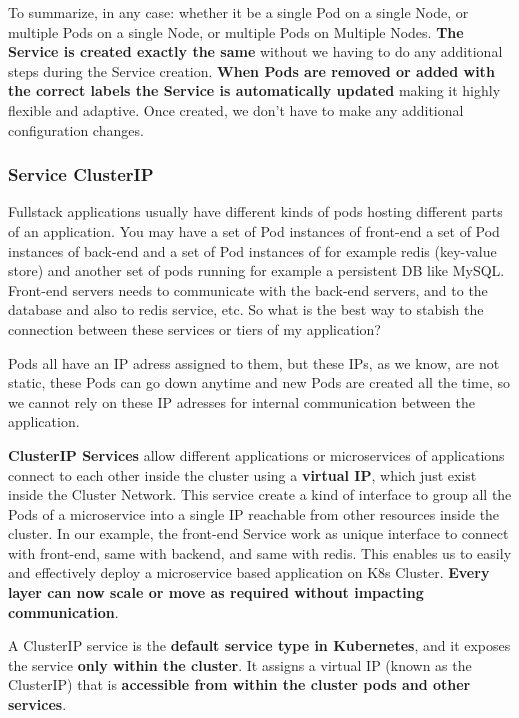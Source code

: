 \documentclass{article}
\begin{document}
To summarize, in any case: whether it be a single Pod on a single Node, or multiple Pods on a single Node, or multiple Pods on Multiple Nodes. \textbf{The Service is created exactly the same} without we having to do any additional steps during the Service creation. \textbf{When Pods are removed or added with the correct labels the Service is automatically updated} making it highly flexible and adaptive. Once created, we don't have to make any additional configuration changes.

\subsubsection{Service ClusterIP}

Fullstack applications usually have different kinds of pods hosting different parts of an application. 
You may have a set of Pod instances of front-end a set of Pod instances of back-end and
a set of Pod instances of for example redis (key-value store) and another 
set of pods running for example a persistent DB like MySQL. 
Front-end servers needs to communicate with the back-end servers, 
and to the database and also to redis service, etc. So what is the best way to stabish the connection between these services or tiers of my application? 

Pods all have an IP adress assigned to them, but these IPs, as we know, are not static, these Pods can go down anytime and new Pods are created all the time, 
so we cannot rely on these IP adresses for internal communication between the application.

\textbf{ClusterIP Services} allow different applications or microservices of applications connect to each other inside the cluster using a \textbf{virtual IP}, which just exist inside the Cluster Network. 
This service create a kind of interface to group all the Pods of a microservice 
into a single IP reachable from other resources inside the cluster. 
In our example, the front-end Service work as unique interface to connect with front-end, same with backend, and same with redis. This enables us to easily and effectively deploy a microservice based application on K8s Cluster. \textbf{Every layer can now scale or move as required without impacting communication}.

A ClusterIP service is the \textbf{default service type in Kubernetes}, 
and it exposes the service \textbf{only within the cluster}. 
It assigns a virtual IP (known as the ClusterIP) that is \textbf{accessible from within the cluster pods and other services}.
\end{document}
